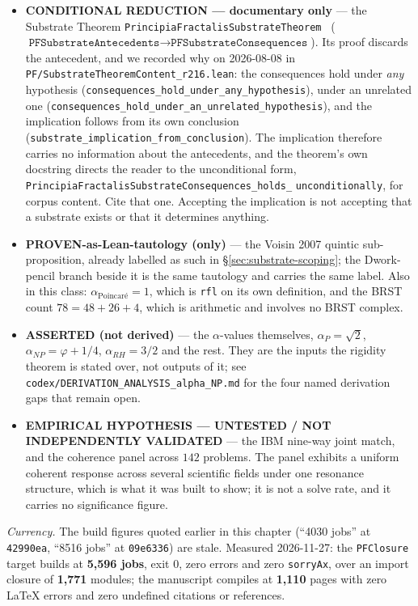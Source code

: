 \begin{itemize}
\item \textbf{CONDITIONAL REDUCTION --- documentary only} --- the Substrate
Theorem \texttt{PrincipiaFractalisSubstrateTheorem} \
($\texttt{PFSubstrateAntecedents} \to \texttt{PFSubstrateConsequences}$). Its
proof discards the antecedent, and we recorded why on 2026-08-08 in
\texttt{PF/SubstrateTheoremContent\_r216.lean}: the consequences hold under
\emph{any} hypothesis
(\texttt{consequences\_hold\_under\_any\_hypothesis}), under an unrelated one
(\texttt{consequences\_hold\_under\_an\_unrelated\_hypothesis}), and the
implication follows from its own conclusion
(\texttt{substrate\_implication\_from\_conclusion}). The implication therefore
carries no information about the antecedents, and the theorem's own docstring
directs the reader to the unconditional form,
\texttt{Prin\-cipia\-Fractalis\-Substrate\-Consequences\_holds\_}\allowbreak
\texttt{unconditionally}, for corpus content. Cite that one. Accepting the
implication is not accepting that a substrate exists or that it determines
anything.

\item \textbf{PROVEN-as-Lean-tautology (only)} --- the Voisin 2007 quintic
sub-proposition, already labelled as such in
\S\ref{sec:substrate-scoping}; the Dwork-pencil branch beside it is the
same tautology and carries the same label. Also in this class: $\alpha_{\text{
Poincar\'e}} = 1$, which is \texttt{rfl} on its own definition, and the BRST
count $78 = 48+26+4$, which is arithmetic and involves no BRST complex.

\item \textbf{ASSERTED (not derived)} --- the $\alpha$-values themselves,
$\alpha_P = \sqrt 2$, $\alpha_{NP} = \varphi + 1/4$, $\alpha_{RH} = 3/2$ and
the rest. They are the inputs the rigidity theorem is stated over, not outputs
of it; see \texttt{codex/DERIVATION\_ANALYSIS\_alpha\_NP.md} for the four named
derivation gaps that remain open.

\item \textbf{EMPIRICAL HYPOTHESIS --- UNTESTED / NOT INDEPENDENTLY
VALIDATED} --- the IBM nine-way joint match, and the coherence panel across
$142$ problems. The panel exhibits a uniform coherent response across several
scientific fields under one resonance structure, which is what it was built to
show; it is not a solve rate, and it carries no significance figure.

\end{itemize}

\noindent\emph{Currency.} The build figures quoted earlier in this chapter
(``4030 jobs'' at \texttt{42990ea}, ``8516 jobs'' at \texttt{09e6336}) are
stale. Measured 2026-11-27: the \texttt{PFClosure} target builds at
\textbf{5{,}596 jobs}, exit $0$, zero errors and zero \texttt{sorryAx}, over an
import closure of \textbf{1{,}771} modules; the manuscript compiles at
\textbf{1{,}110} pages with zero \LaTeX{} errors and zero undefined citations
or references.

